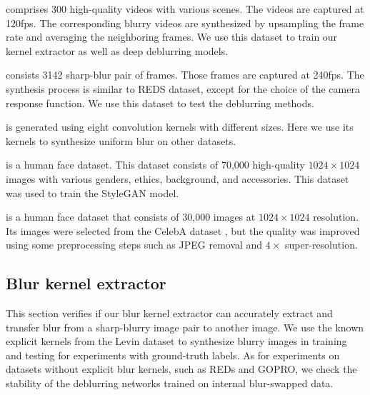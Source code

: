 \documentclass[final]{cvpr}
\newcommand{\Tref}[1]{Table~\ref{#1}}
\begin{document}

 comprises 300 high-quality videos with various scenes. The videos are captured at 120fps. The corresponding blurry videos are synthesized by upsampling the frame rate and averaging the neighboring frames. We use this dataset to train our kernel extractor as well as deep deblurring models.

 consists 3142 sharp-blur pair of frames. Those frames are captured at 240fps. The synthesis process is similar to REDS dataset, except for the choice of the camera response function. We use this dataset to test the deblurring methods.

 is generated using eight convolution kernels with different sizes. Here we use its kernels to synthesize uniform blur on other datasets.

 is a human face dataset. This dataset consists of 70,000 high-quality $1024{\times}1024$ images with various genders, ethics, background, and accessories. This dataset was used to train the StyleGAN model.

 \cite{karras2017progressive} is a human face dataset that consists of 30,000 images at $1024{\times}1024$ resolution. Its images were selected from the CelebA dataset \cite{liu2015faceattributes}, but the quality was improved using some preprocessing steps such as JPEG removal and $4{\times}$ super-resolution.

\subsection{Blur kernel extractor}
This section verifies if our blur kernel extractor can accurately extract and transfer blur from a sharp-blurry image pair to another image. We use the known explicit kernels from the Levin dataset to synthesize blurry images in training and testing for experiments with ground-truth labels. As for experiments on datasets without explicit blur kernels, such as REDs and GOPRO, we check the stability of the deblurring networks trained on internal blur-swapped data.
\end{document}
